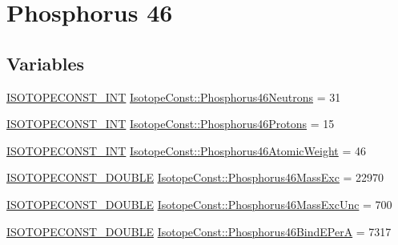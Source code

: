 \hypertarget{group___isotope_const-_phosphorus-_p46}{}\section{Phosphorus 46}
\label{group___isotope_const-_phosphorus-_p46}
\subsection*{Variables}
\begin{DoxyCompactItemize}
\item 
\mbox{\hyperlink{group___isotope_const-_macros_ga5f18360b3e99483a35c32d789e62621c}{I\+S\+O\+T\+O\+P\+E\+C\+O\+N\+S\+T\+\_\+\+I\+NT}} \mbox{\hyperlink{group___isotope_const-_phosphorus-_p46_gaea86682d1ce0c34b25aa105fef1092ad}{Isotope\+Const\+::\+Phosphorus46\+Neutrons}} = 31
\item 
\mbox{\hyperlink{group___isotope_const-_macros_ga5f18360b3e99483a35c32d789e62621c}{I\+S\+O\+T\+O\+P\+E\+C\+O\+N\+S\+T\+\_\+\+I\+NT}} \mbox{\hyperlink{group___isotope_const-_phosphorus-_p46_gaabea8e31d0f57a6ed972dcb1052a4b6a}{Isotope\+Const\+::\+Phosphorus46\+Protons}} = 15
\item 
\mbox{\hyperlink{group___isotope_const-_macros_ga5f18360b3e99483a35c32d789e62621c}{I\+S\+O\+T\+O\+P\+E\+C\+O\+N\+S\+T\+\_\+\+I\+NT}} \mbox{\hyperlink{group___isotope_const-_phosphorus-_p46_ga57d067ce0aacc24abadc3f92997ab879}{Isotope\+Const\+::\+Phosphorus46\+Atomic\+Weight}} = 46
\item 
\mbox{\hyperlink{group___isotope_const-_macros_ga8f45a7272ce02c0b4c65c44636ed719a}{I\+S\+O\+T\+O\+P\+E\+C\+O\+N\+S\+T\+\_\+\+D\+O\+U\+B\+LE}} \mbox{\hyperlink{group___isotope_const-_phosphorus-_p46_ga08ab8cc97c8f9a12943cc1f3afdb7415}{Isotope\+Const\+::\+Phosphorus46\+Mass\+Exc}} = 22970
\item 
\mbox{\hyperlink{group___isotope_const-_macros_ga8f45a7272ce02c0b4c65c44636ed719a}{I\+S\+O\+T\+O\+P\+E\+C\+O\+N\+S\+T\+\_\+\+D\+O\+U\+B\+LE}} \mbox{\hyperlink{group___isotope_const-_phosphorus-_p46_gab9536ab89ca3ef44f7be25a671eca17e}{Isotope\+Const\+::\+Phosphorus46\+Mass\+Exc\+Unc}} = 700
\item 
\mbox{\hyperlink{group___isotope_const-_macros_ga8f45a7272ce02c0b4c65c44636ed719a}{I\+S\+O\+T\+O\+P\+E\+C\+O\+N\+S\+T\+\_\+\+D\+O\+U\+B\+LE}} \mbox{\hyperlink{group___isotope_const-_phosphorus-_p46_ga58d6df77a046798b02124f5263f62330}{Isotope\+Const\+::\+Phosphorus46\+Bind\+E\+PerA}} = 7317
\item 

\end{DoxyCompactItemize}
